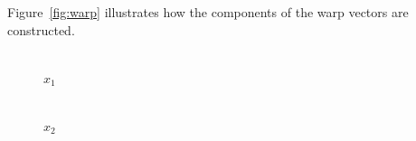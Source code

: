 \documentclass[12pt,a4paper,oneside,openright]{book}
\newcommand{\fig}[1]{Figure~\ref{fig:#1}}
\begin{document}
\begin{CJK}{UTF8}{}
\fig{warp} illustrates how the components of the warp vectors are constructed.
\begin{figure}[htbp]
  \begin{center}
    \begin{minipage}[t]{.22\textwidth}
      \begin{center}
        \\
        $x_1$
      \end{center}
    \end{minipage}
    \hspace{.25cm}
    \begin{minipage}[t]{.22\textwidth}
      \begin{center}
        \\
        $x_2$
      \end{center}
    \end{minipage}

\end{center}
\end{figure}
\end{CJK}
\end{document}
